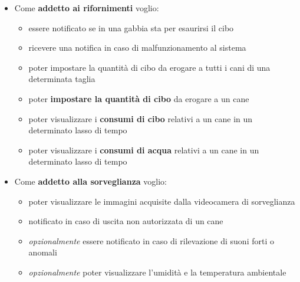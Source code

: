 \begin{itemize}
            \item Come \textbf{addetto ai  rifornimenti}
            voglio:
            \begin{itemize}
                \item essere notificato se in una gabbia sta per esaurirsi il cibo
                \item ricevere una notifica in caso di malfunzionamento al sistema
                \item poter impostare la quantità di cibo da erogare a tutti i cani di una determinata taglia
                \item poter \textbf{impostare la quantità di cibo} da erogare a un cane
                \item poter visualizzare i \textbf{consumi di cibo} relativi a un cane in un determinato lasso di tempo
                \item poter visualizzare i \textbf{consumi di acqua} relativi a un cane in un determinato lasso di tempo
            \end{itemize}
            
            \item Come \textbf{addetto alla sorveglianza}
            voglio:
            \begin{itemize}
                \item poter visualizzare le immagini acquisite dalla videocamera di sorveglianza
                \item notificato in caso di uscita non autorizzata di un cane
                \item \textit{opzionalmente} essere notificato in caso di rilevazione di suoni forti o anomali
                \item \textit{opzionalmente} poter visualizzare l’umidità e la temperatura ambientale 
            \end{itemize}
        \end{itemize}
        
